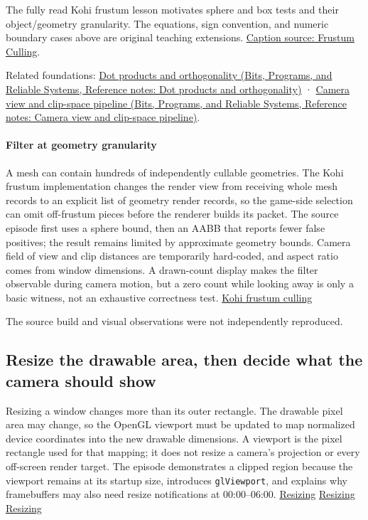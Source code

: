 The fully read Kohi frustum lesson motivates sphere and box tests and their object/geometry granularity. The equations, sign convention, and numeric boundary cases above are original teaching extensions. \href{https://www.youtube.com/watch?v=vJrfcI_bMTA}{Caption source: Frustum Culling}.

Related foundations: \href{../01-Bits-Programs-and-Reliable-Systems/main.pdf\#nameddest=appendix-8bc4e8fc547c}{Dot products and orthogonality (Bits, Programs, and Reliable Systems, Reference notes: Dot products and orthogonality)} · \href{../01-Bits-Programs-and-Reliable-Systems/main.pdf\#nameddest=appendix-1c07d64f5e70}{Camera view and clip-space pipeline (Bits, Programs, and Reliable Systems, Reference notes: Camera view and clip-space pipeline)}.

\paragraph{Filter at geometry granularity}\label{06-engine-ii-ch026-filter-at-geometry-granularity}

A mesh can contain hundreds of independently cullable geometries. The Kohi frustum implementation changes the render view from receiving whole mesh records to an explicit list of geometry render records, so the game-side selection can omit off-frustum pieces before the renderer builds its packet. The source episode first uses a sphere bound, then an AABB that reports fewer false positives; the result remains limited by approximate geometry bounds. Camera field of view and clip distances are temporarily hard-coded, and aspect ratio comes from window dimensions. A drawn-count display makes the filter observable during camera motion, but a zero count while looking away is only a basic witness, not an exhaustive correctness test. \href{https://www.youtube.com/watch?v=vJrfcI_bMTA}{Kohi frustum culling}

The source build and visual observations were not independently reproduced.

\subsection{Resize the drawable area, then decide what the camera should show}\label{06-engine-ii-ch026-resize-the-drawable-area-then-decide-what-the-camera-should-show}

Resizing a window changes more than its outer rectangle. The drawable pixel area may change, so the OpenGL viewport must be updated to map normalized device coordinates into the new drawable dimensions. A viewport is the pixel rectangle used for that mapping; it does not resize a camera's projection or every off-screen render target. The episode demonstrates a clipped region because the viewport remains at its startup size, introduces \texttt{glViewport}, and explains why framebuffers may also need resize notifications at 00:00--06:00. \href{https://www.youtube.com/watch?v=7LswjvgRqbw&t=0s}{Resizing} \href{https://www.youtube.com/watch?v=7LswjvgRqbw&t=120s}{Resizing} \href{https://www.youtube.com/watch?v=7LswjvgRqbw&t=240s}{Resizing}

